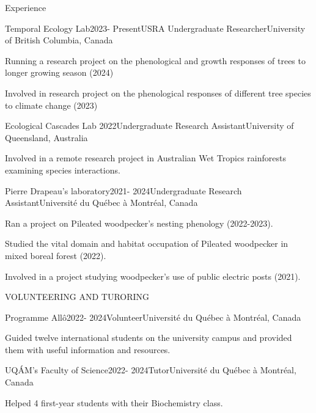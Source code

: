 \documentclass[
	11pt, %
]{resume} %
\begin{document}
\begin{rSection}{Experience}

	\begin{rSubsection}{Temporal Ecology Lab}{2023- Present}{USRA Undergraduate Researcher}{University of British Columbia, Canada}
		\item Running a research project on the phenological and growth responses of trees to longer growing season (2024) 
		\item Involved in research project on the phenological responses of different tree species to climate change (2023)
	\end{rSubsection}


	\begin{rSubsection}{Ecological Cascades Lab }{2022}{Undergraduate Research Assistant}{University of Queensland, Australia}
		\item Involved in a remote research project in Australian Wet Tropics rainforests examining species interactions.
	\end{rSubsection}


	\begin{rSubsection}{Pierre Drapeau’s laboratory}{2021- 2024}{Undergraduate Research Assistant}{Université du Québec à Montréal, Canada}
		\item Ran a project on Pileated woodpecker's nesting phenology (2022-2023).
		\item Studied the vital domain and habitat occupation of Pileated woodpecker in mixed boreal forest (2022).
		\item Involved in a project studying woodpecker's use of public electric posts (2021).
	\end{rSubsection}
\end{rSection}


\begin{rSection}{VOLUNTEERING AND TURORING}

	\begin{rSubsection}{Programme Allô}{2022- 2024}{Volunteer}{Université du Québec à Montréal, Canada}
		\item Guided twelve international students on the university campus and provided them with useful information and resources.
	\end{rSubsection}
	\begin{rSubsection}{UQÁM's Faculty of Science}{2022- 2024}{Tutor}{Université du Québec à Montréal, Canada}
		\item Helped 4 first-year students with their Biochemistry class.
	\end{rSubsection}
\end{rSection}
\end{document}
